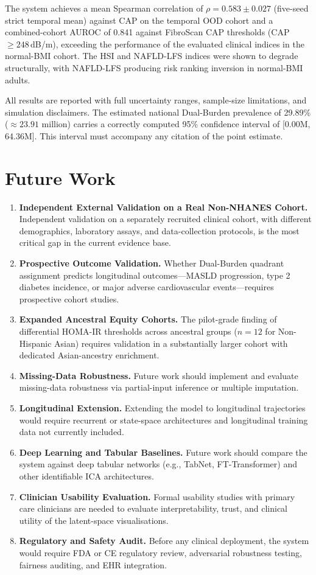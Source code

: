 \documentclass[12pt,a4paper,oneside]{report}
\begin{document}
The system achieves a mean Spearman correlation of $\rho = 0.583 \pm 0.027$ (five-seed strict temporal mean) against CAP on the temporal OOD cohort and a combined-cohort AUROC of 0.841 against FibroScan CAP thresholds (CAP $\geq 248$\,dB/m), exceeding the performance of the evaluated clinical indices in the normal-BMI cohort. The HSI and NAFLD-LFS indices were shown to degrade structurally, with NAFLD-LFS producing risk ranking inversion in normal-BMI adults.

All results are reported with full uncertainty ranges, sample-size limitations, and simulation disclaimers. The estimated national Dual-Burden prevalence of 29.89\% ($\approx 23.91$ million) carries a correctly computed 95\% confidence interval of [0.00M, 64.36M]. This interval must accompany any citation of the point estimate.

\section{Future Work}

\begin{enumerate}[leftmargin=*]
    \item \textbf{Independent External Validation on a Real Non-NHANES Cohort.} Independent validation on a separately recruited clinical cohort, with different demographics, laboratory assays, and data-collection protocols, is the most critical gap in the current evidence base.
    \item \textbf{Prospective Outcome Validation.} Whether Dual-Burden quadrant assignment predicts longitudinal outcomes---MASLD progression, type 2 diabetes incidence, or major adverse cardiovascular events---requires prospective cohort studies.
    \item \textbf{Expanded Ancestral Equity Cohorts.} The pilot-grade finding of differential HOMA-IR thresholds across ancestral groups ($n = 12$ for Non-Hispanic Asian) requires validation in a substantially larger cohort with dedicated Asian-ancestry enrichment.
    \item \textbf{Missing-Data Robustness.} Future work should implement and evaluate missing-data robustness via partial-input inference or multiple imputation.
    \item \textbf{Longitudinal Extension.} Extending the model to longitudinal trajectories would require recurrent or state-space architectures and longitudinal training data not currently included.
    \item \textbf{Deep Learning and Tabular Baselines.} Future work should compare the system against deep tabular networks (e.g., TabNet, FT-Transformer) and other identifiable ICA architectures.
    \item \textbf{Clinician Usability Evaluation.} Formal usability studies with primary care clinicians are needed to evaluate interpretability, trust, and clinical utility of the latent-space visualisations.
    \item \textbf{Regulatory and Safety Audit.} Before any clinical deployment, the system would require FDA or CE regulatory review, adversarial robustness testing, fairness auditing, and EHR integration.
\end{enumerate}
\end{document}
